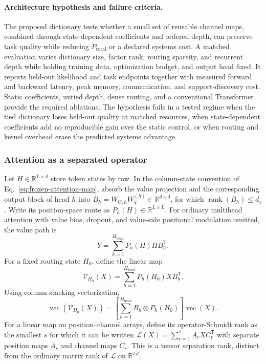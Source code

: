 \documentclass[10pt]{article}
\theoremstyle{definition}
\theoremstyle{remark}
\newcommand{\BookSubsection}[1]{\subsubsection{#1}}
\begin{document}
\paragraph{Architecture hypothesis and failure criteria.}
The proposed dictionary tests whether a small set of reusable channel maps, combined through
state-dependent coefficients and ordered depth, can preserve task quality while reducing
$P_{\mathrm{total}}$ or a declared systems cost.  A matched evaluation varies dictionary size,
factor rank, routing sparsity, and recurrent depth while holding training data, optimization budget,
and output head fixed.  It reports held-out likelihood and task endpoints together with measured
forward and backward latency, peak memory, communication, and support-discovery cost.  Static
coefficients, untied depth, dense routing, and a conventional Transformer provide the required
ablations.  The hypothesis fails in a tested regime when the tied dictionary loses held-out quality
at matched resources, when state-dependent coefficients add no reproducible gain over the static
control, or when routing and kernel overhead erase the predicted systems advantage.

\BookSubsection{Attention as a separated operator}

Let $H\in\mathbb R^{L\times d}$ store token states by row.  In the column-state convention of
Eq.~\ref{eq:frozen-attention-map}, absorb the value projection and the corresponding output block
of head $h$ into
$B_h=W_{O,h}W_V^{(h)}\in\mathbb R^{d\times d}$, for which
$\operatorname{rank}(B_h)\leq d_v$.  Write its position-space route as
$P_h(H)\in\mathbb R^{L\times L}$.  For ordinary multihead attention with value bias, dropout, and
value-side positional modulation omitted, the value path is
\begin{equation}
Y=\sum_{h=1}^{H_{\mathrm{head}}}P_h(H)HB_h^{\mathsf T}.
\label{eq:attention-separated-evaluation}
\end{equation}
For a fixed routing state $H_0$, define the linear map
\begin{equation}
\mathcal V_{H_0}(X)
=\sum_{h=1}^{H_{\mathrm{head}}}P_h(H_0)XB_h^{\mathsf T}.
\label{eq:frozen-value-operator}
\end{equation}
Using column-stacking vectorization,
\begin{equation}
\operatorname{vec}\!\left(\mathcal V_{H_0}(X)\right)
=\left[
\sum_{h=1}^{H_{\mathrm{head}}}
B_h\otimes P_h(H_0)
\right]\operatorname{vec}(X).
\label{eq:attention-kronecker-sum}
\end{equation}
For a linear map on position--channel arrays, define its operator-Schmidt rank as the smallest $s$
for which it can be written $\mathcal L(X)=\sum_{r=1}^{s}A_rXC_r^{\mathsf T}$ with separate
position maps $A_r$ and channel maps $C_r$.  This is a tensor separation rank, distinct from the
ordinary matrix rank of $\mathcal L$ on $\mathbb R^{Ld}$.
\end{document}
